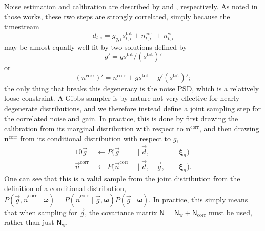 \documentclass[twocolumn]{../../common/aa}
\newcommand{\g}[0]{\vec{g}}
\newcommand{\ncorr}{\vec n^\mathrm{corr}}
\newcommand{\data}{\vec d}
\begin{document}
Noise estimation and calibration are described by \citet{bp06} and \citet{bp07}, respectively. As noted in those works, these two steps are strongly correlated, simply because the timestream
\begin{equation}
	d_{t,i}=g_{q,i}s_{t,i}^\mathrm{tot}+n_{t,i}^\mathrm{corr}+n_{t,i}^\mathrm{w}
\end{equation}
may be almost equally well fit by two solutions defined by
\begin{equation}
	g'=gs^\mathrm{tot}/(s^\mathrm{tot})'
\end{equation}
or 
\begin{equation}
	{(n^\mathrm{corr})'=n^\mathrm{corr}+gs^\mathrm{tot}+g'(s^\mathrm{tot})'};
\end{equation} the only thing that breaks this degeneracy is the noise PSD, which is a relatively loose constraint. A Gibbs sampler is by nature not very effective for nearly degenerate distributions, and we therefore instead define a joint sampling step for the correlated noise and gain. In practice, this is done by first drawing the calibration from its marginal distribution with respect to $\boldsymbol n^\mathrm{corr}$, and then drawing $\boldsymbol n^\mathrm{corr}$ from its conditional distribution with respect to $g$,
\begin{alignat}{10}
	\g&\,\leftarrow P(\g&\,\mid\data, &\, &\,&\,\boldsymbol\xi_n)
	\label{eq:gmarg}
	\\
	\ncorr&\,\leftarrow P(\ncorr&\,\mid\data, &\,\g, &\,&\,\boldsymbol\xi_n).
	\label{eq:ncorr_only}
\end{alignat}
One can see that this is a valid sample from the joint distribution from the definition of a conditional distribution, $P(\g,\ncorr\mid\boldsymbol\omega)=P(\ncorr\mid\g,\boldsymbol\omega)P(\g\mid\boldsymbol\omega)$. In practice, this simply means that when sampling for $\g$, the covariance matrix $\mathsf N=\mathsf N_\textrm{w}+\mathsf N_\textrm{corr}$ must be used, rather than just $\mathsf N_\mathrm{w}$.
\end{document}
